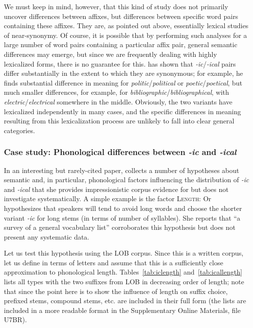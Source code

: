 We must keep in mind, however, that this kind of study does not primarily uncover differences between affixes,  but differences between specific word pairs containing these affixes.  They are, as pointed out above, essentially lexical studies of near\hyp{}synonymy.  Of course, it is possible that by performing such analyses for a large number of word pairs containing a particular affix  pair, general semantic  differences may emerge, but since we are frequently dealing with highly lexicalized  forms, there is no guarantee for this. \citet{gries_corpus-linguistic_2001, gries_testing_2003} has shown that \textit{-ic}\slash \textit{-ical} pairs differ substantially in the extent to which they are synonymous;  for example, he finds substantial difference in meaning for \textit{politic}\slash \textit{political} or \textit{poetic}\slash \textit{poetical}, but much smaller differences, for example, for \textit{bibliographic}\slash \textit{bibliographical}, with \textit{electric}\slash \textit{electrical} somewhere in the middle. Obviously, the two variants have lexicalized  independently in many cases, and the specific differences in meaning  resulting from this lexicalization process are unlikely to fall into clear general categories.

\subsubsection{Case study: Phonological differences between \textit{-ic} and \textit{-ical}}\largerpage[2]
\label{sec:phonologicaldifferencesbetweenicandical}

In an interesting but rarely\hyp{}cited paper, \citet{or_corpus-based_1994} collects a number of hypotheses about semantic  and, in particular, phonological factors influencing the distribution  of \textit{-ic} and \textit{-ical} that she provides impressionistic corpus evidence for but does not investigate systematically. A simple example is the factor \textsc{Length}:  Or hypothesizes that speakers will tend to avoid long words and choose the shorter variant \textit{-ic} for long stems  (in terms of number of syllables).  She reports that ``a survey of a general vocabulary list'' corroborates this hypothesis but does not present any systematic data.

Let us test this hypothesis using the LOB  corpus. Since this is a written  corpus, let us define   in terms of letters and assume that this is a sufficiently close approximation to phonological length. Tables~\ref{tab:iclength} and~\ref{tab:icallength} lists all types  with the two suffixes  from LOB  in decreasing order of length; note that since the point here is to show the influence of length on suffix choice, prefixed stems,  compound stems, etc. are included in their full form (the lists are included in a more readable format in the Supplementary Online Materials, file U7BR).

